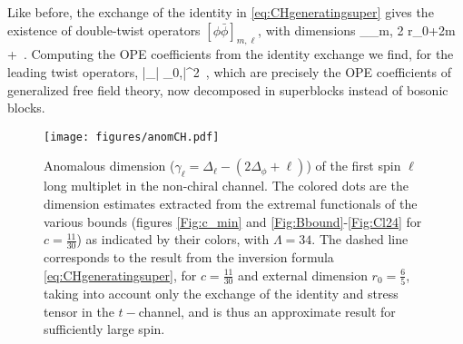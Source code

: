 Like before, the exchange of the identity in \eqref{eq:CHgeneratingsuper} gives the existence of double-twist operators $\left[\phi \bar{\phi}\right]_{m,\ell}$, with dimensions 
\be
\Delta_{\left[\phi \bar{\phi}\right]_{m,\ell}}  2 r_0+2m + \ell \,.
\label{eq:nonchiraldoubletwist}
\ee
Computing the OPE coefficients from the identity exchange we find, for the leading twist operators,
\be
|\lambda_{\phi \bar{\phi} \left[\phi \bar{\phi}\right]_{0,\ell}}|^2   \,,
\label{eq:OPEdoubletwistsuper}
\ee
which are precisely the OPE coefficients of generalized free field theory, now decomposed in superblocks instead of bosonic blocks.

\begin{figure}[htb!]
             \begin{center}           
              \texttt{[image: figures/anomCH.pdf]}
              \caption{Anomalous dimension ($\gamma_\ell = \Delta_\ell - (2 \Delta_\phi + \ell)$) of the first spin $\ell$ long multiplet in the non-chiral channel. The colored dots are the dimension estimates extracted from the extremal functionals of the various bounds (figures \ref{Fig:c_min} and \ref{Fig:Bbound}-\ref{Fig:Cl24} for $c=\tfrac{11}{30}$) as indicated by their colors, with $\Lambda=34$. The dashed line corresponds to the result from the inversion formula \eqref{eq:CHgeneratingsuper}, for $c=\tfrac{11}{30}$ and external dimension $r_0=\frac65$, taking into account only the exchange of the identity and stress tensor in the $t-$channel, and is thus an approximate result for sufficiently large spin.
              }
              \label{Fig:anomCH}
            \end{center}
\end{figure}

